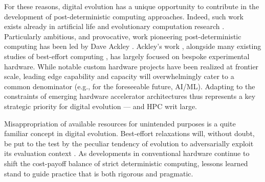 For these reasons, digital evolution has a unique opportunity to contribute in the development of post-deterministic computing approaches.
Indeed, such work exists already in artificial life \cite{ray1995proposal,moreno2021exploring} and evolutionary computation research \cite{izzo2009parallel}.
Particularly ambitious, and provocative, work pioneering post-deterministic computing has been led by Dave Ackley \cite{ackley2014indefinitely}.
Ackley's work \cite{Ackley2023,ganapati2009modular}, alongside many existing studies of best-effort computing \cite{chippa2014scalable,ackley2011homeostatic,cho2012ersa,chakrapani2008probabilistic,rhodes2020real}, has largely focused on bespoke experimental hardware.
While notable custom hardware projects have been realized at frontier scale, leading edge capability and capacity will overwhelmingly cater to a common denominator (e.g., for the foreseeable future, AI/ML).
Adapting to the constraints of emerging hardware accelerator architectures thus represents a key strategic priority for digital evolution --- and HPC writ large.

Misappropriation of available resources for unintended purposes is a quite familiar concept in digital evolution.
Best-effort relaxations will, without doubt, be put to the test by the peculiar tendency of evolution to adversarially exploit its evaluation context \cite{Thompson1997,Lehman2020}.
As developments in conventional hardware continue to shift the cost-payoff balance of strict deterministic computing, lessons learned stand to guide practice that is both rigorous and pragmatic.



